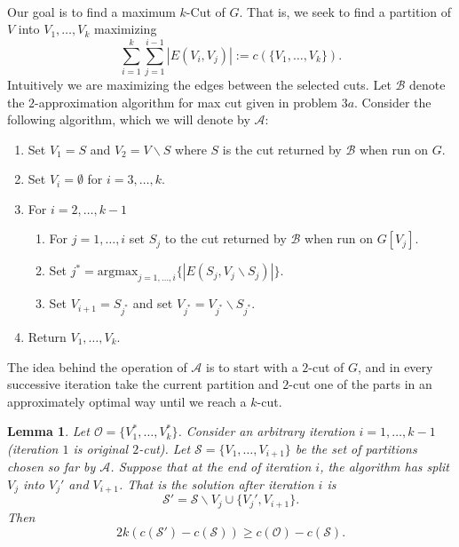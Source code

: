 \documentclass[letterpaper,12pt,oneside,onecolumn]{article}
\newcommand{\cA}{\mathcal{A}} \newcommand{\cB}{\mathcal{B}}
\newcommand{\cO}{\mathcal{O}} \newcommand{\cP}{\mathcal{P}}
\newcommand{\cS}{\mathcal{S}} \newcommand{\cT}{\mathcal{T}}
\newtheorem{lemma}[fact]{Lemma}
\begin{document}
\paragraph{}
Our goal is to find a maximum $k$-Cut of $G$. That is, we seek to find a partition of $V$ into $V_1, \dots, V_k$ maximizing
$$\sum_{i=1}^k \sum_{j = 1}^{i-1} |E(V_i, V_j)| := c(\{V_1, \dots, V_k\}).$$
Intuitively we are maximizing the edges between the selected cuts. Let $\cB$ denote the $2$-approximation algorithm for max cut given in problem $3a$. Consider the following algorithm, which we will denote by $\cA$:
\begin{enumerate}
\item Set $V_1 = S$ and $V_2 = V\backslash S$ where $S$ is the cut returned by $\cB$ when run on $G$.
\item Set $V_i = \emptyset$ for $i = 3, \dots, k$.
\item For $i = 2, \dots, k-1$
\begin{enumerate}
\item For $j = 1, \dots, i$ set $S_j$ to the cut returned by $\cB$ when run on $G[V_j]$.
\item Set $j^* = \text{argmax}_{j=1,\dots, i} \{|E(S_j, V_j\backslash S_j)|\}$.
\item Set $V_{i+1} = S_{j^*}$ and set $V_{j^*} = V_{j^*} \backslash S_{j^*}$.
\end{enumerate}
\item Return $V_1, \dots, V_k$.
\end{enumerate}
The idea behind the operation of $\cA$ is to start with a $2$-cut of $G$, and in every successive iteration take the current partition and $2$-cut one of the parts in an approximately optimal way until we reach a $k$-cut.
\begin{lemma}\label{lemma:3b1}
Let $\cO = \{V^*_1, \dots, V^*_k\}$. Consider an arbitrary iteration $i = 1, \dots, k-1$ (iteration $1$ is original $2$-cut). Let $\cS = \{V_1, \dots, V_{i+1}\}$ be the set of partitions chosen so far by $\cA$. Suppose that at the end of iteration $i$, the algorithm has split $V_j$ into $V_j'$ and $V_{i+1}$. That is the solution after iteration $i$ is
$$\cS' = \cS \backslash V_j \cup \{V_j', V_{i+1}\}.$$
Then 
$$2k(c(\cS') - c(\cS)) \geq c(\cO) - c(\cS).$$
\end{lemma}
\end{document}
